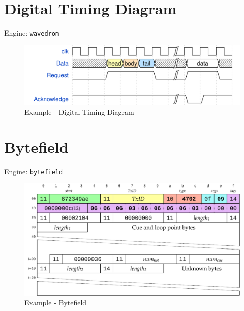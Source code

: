 \documentclass[
  12pt,
  a4paper,
  12pt,
  oneside,
  openany]{book}
\begin{document}
\newpage

\hypertarget{kroki-timing}{%
\section{Digital Timing Diagram}\label{kroki-timing}}

Engine: \texttt{wavedrom}

\begin{figure}

{\centering \includegraphics{generated/diagrams-examples-wavedrom-Rmd} 

}

\caption{Example - Digital Timing Diagram}\label{fig:examples-timing}
\end{figure}

\newpage

\hypertarget{kroki-bytefield}{%
\section{Bytefield}\label{kroki-bytefield}}

Engine: \texttt{bytefield}

\begin{figure}

{\centering \includegraphics{generated/diagrams-examples-bytefield-Rmd} 

}

\caption{Example - Bytefield}\label{fig:examples-bytefield}
\end{figure}
\end{document}
